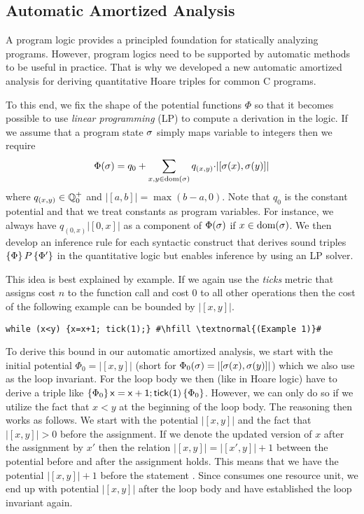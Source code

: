 \documentclass[nocopyrightspace,preprint]{sigplanconf}
\begin{document}
\subsection{Automatic Amortized Analysis}

A program logic provides a principled foundation for statically
analyzing programs.  However, program logics need to be supported by
automatic methods to be useful in practice.  That is why we developed a
new automatic amortized analysis for deriving quantitative Hoare
triples for common C programs.

To this end, we fix the shape of the potential functions $\Phi$ so
that it becomes possible to use \emph{linear programming} (LP) to
compute a derivation in the logic.  If we assume that a program state
$\sigma$ simply maps variable to integers then we require
$$
\Phi(\sigma) = q_0 + \sum_{x,y \in  \text{dom}(\sigma)} q_{(x,y)} {\cdot} |[\sigma(x),\sigma(y)]|
$$
where $q_{(x,y)} \in \mathbb Q^+_0$ and $|[a,b]| = \max(b-a,0)$.  Note that
$q_0$ is the constant potential and that we treat constants as program
variables.  For instance, we always have $q_{(0,x)}|[0,x]|$ as a
component of $\Phi(\sigma)$ if $x \in  \text{dom}(\sigma)$.
%
We then develop an inference rule for each syntactic construct that
derives sound triples $\{\Phi\}\, P\, \{\Phi'\}$ in the quantitative
logic but enables inference by using an LP solver.  

This idea is best explained by example.  If we again use the
\emph{ticks} metric that assigns cost $n$ to the function call
 and cost $0$ to all other operations then the cost of
the following example can be bounded by $|[x,y]|$.
\begin{lstlisting}
while (x<y) {x=x+1; tick(1);} #\hfill \textnormal{(Example 1)}#
\end{lstlisting}
To derive this bound in our automatic amortized analysis, we start
with the initial potential $\Phi_0 = |[x,y]|$ (short for
$\Phi_0(\sigma) = |[\sigma(x),\sigma(y)]|$) which we also use as the
loop invariant.  For the loop body we then (like in Hoare logic) have
to derive a triple like
$\{\Phi_0\}\, \mathsf{x=x+1;tick(1)}\, \{\Phi_0\}$.  However, we can
only do so if we utilize the fact that $x<y$ at the beginning of the
loop body.  The reasoning then works as follows.  We start with the
potential $|[x,y]|$ and the fact that $|[x,y]| > 0$ before the
assignment.  If we denote the updated version of $x$ after the
assignment by $x'$ then the relation $|[x,y]| = |[x',y]| + 1$ between
the potential before and after the assignment  holds.
This means that we have the potential $|[x,y]| + 1$ before the
statement .  Since  consumes one resource unit,
we end up with potential $|[x,y]|$ after the loop body and have
established the loop invariant again.
\end{document}

